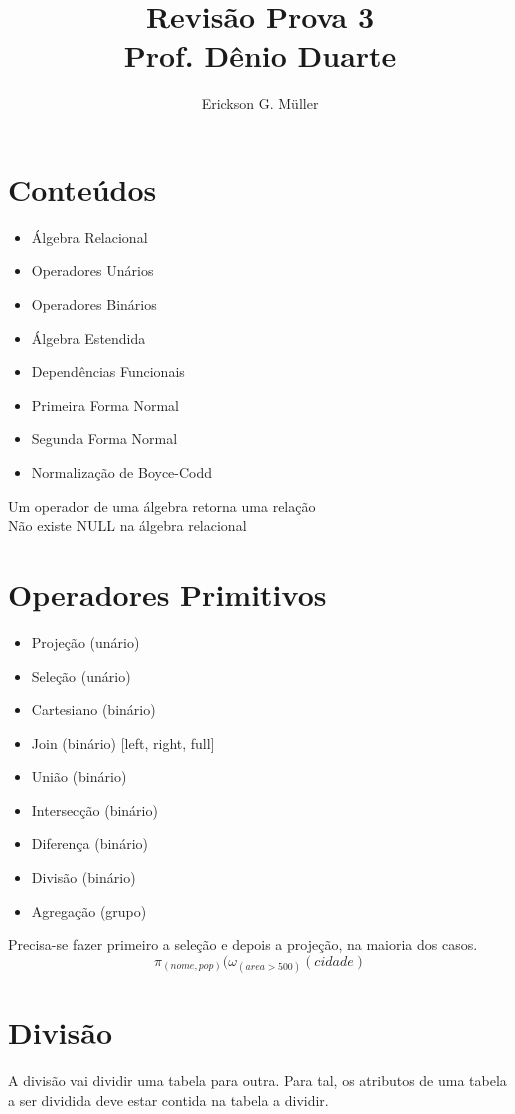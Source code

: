 \documentclass[ ]{article}
\title{Revisão Prova 3\\ Prof. Dênio Duarte}
\author{Erickson G. Müller}
\begin{document}
	\maketitle
	\newpage
	\section{Conteúdos}
		\begin{itemize}
			\item Álgebra Relacional
			\item Operadores Unários
			\item Operadores Binários
			\item Álgebra Estendida
			\item Dependências Funcionais
			\item Primeira Forma Normal
			\item Segunda Forma Normal
			\item Normalização de Boyce-Codd
		\end{itemize}
	Um operador de uma álgebra retorna uma relação\\
	Não existe NULL na álgebra relacional
	\section{Operadores Primitivos}
		\begin{itemize}
			\item Projeção (unário)
			\item Seleção (unário)
			\item Cartesiano (binário)
			\item Join (binário) [left, right, full]
			\item União (binário)
			\item Intersecção (binário)
			\item Diferença (binário)
			\item Divisão (binário)
			\item Agregação (grupo)
		\end{itemize}
		Precisa-se fazer primeiro a seleção e depois a projeção, na maioria dos casos.
		$$\pi_{(nome, pop)}(\omega_{(area>500)}(cidade)$$
	\section{Divisão}
		A divisão vai dividir uma tabela para outra. Para tal, os atributos de uma tabela a ser dividida deve estar contida na tabela a dividir.
\end{document}
